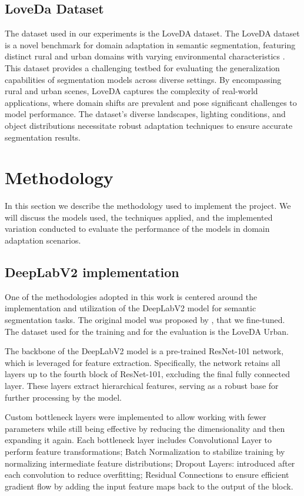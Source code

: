 \documentclass[10pt,twocolumn,letterpaper]{article}
\begin{document}
\subsection{LoveDa Dataset}

The dataset used in our experiments is the LoveDA dataset. The LoveDA dataset is a novel benchmark for domain adaptation in semantic segmentation, featuring distinct rural and urban domains with varying environmental characteristics \cite{wang2021loveda}. This dataset provides a challenging testbed for evaluating the generalization capabilities of segmentation models across diverse settings. By encompassing rural and urban scenes, LoveDA captures the complexity of real-world applications, where domain shifts are prevalent and pose significant challenges to model performance. The dataset's diverse landscapes, lighting conditions, and object distributions necessitate robust adaptation techniques to ensure accurate segmentation results.

\section{Methodology}

\label{sec:methodology}

In this section we describe the methodology used to implement the project. We will discuss the models used, the techniques applied, and the implemented variation conducted to evaluate the performance of the models in domain adaptation scenarios.


\subsection{DeepLabV2 implementation}
One of the methodologies adopted in this work is centered around the implementation and utilization of the DeepLabV2 model for semantic segmentation tasks. 
The original model was proposed by \cite{chen2017deeplab}, that we fine-tuned.
The dataset used for the training and for the evaluation is the LoveDA Urban. 


The backbone of the DeepLabV2 model is a pre-trained ResNet-101 network, which is leveraged for feature extraction. Specifically, the network retains all layers up to the fourth block of ResNet-101, excluding the final fully connected layer. These layers extract hierarchical features, serving as a robust base for further processing by the model.

Custom bottleneck layers were implemented to allow working with fewer parameters while still being effective by reducing the dimensionality and then expanding it again. Each bottleneck layer includes Convolutional Layer to perform feature transformations; Batch Normalization to stabilize training by normalizing intermediate feature distributions; Dropout Layers: introduced after each convolution to reduce overfitting; Residual Connections to ensure efficient gradient flow by adding the input feature maps back to the output of the block.
\end{document}
